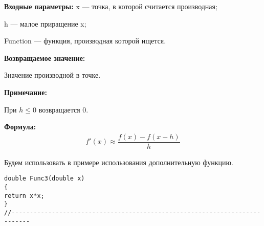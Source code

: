\textbf{Входные параметры:}
 x --- точка, в которой считается производная;
 
 h --- малое приращение x;
 
 Function --- функция, производная которой ищется.

\textbf{Возвращаемое значение:}
 
 Значение производной в точке.
 
 \textbf{Примечание:}
 
 При $h\leq0$ возвращается $0$.

\textbf{Формула:}
\begin{eqnarray*}
f'\left( x\right) \approx \dfrac{f\left( x\right)-f\left( x-h\right) }{h}
\end{eqnarray*}

Будем использовать в примере использования дополнительную функцию.

\begin{lstlisting}[caption=Дополнительная функция]
double Func3(double x)
{
return x*x;
}
//---------------------------------------------------------------------------
\end{lstlisting}